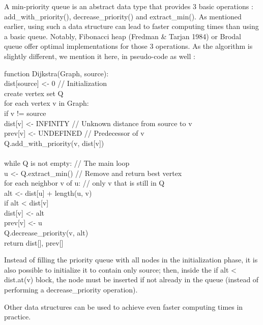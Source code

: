 \documentclass{article}
\newcommand\tab[1][1cm]{\hspace*{#1}}
\begin{document}
A min-priority queue is an abstract data type that provides 3 basic operations : add\_with\_priority(), decrease\_priority() and extract\_min(). As mentioned earlier, using such a data structure can lead to faster computing times than using a basic queue. Notably, Fibonacci heap (Fredman \& Tarjan 1984) or Brodal queue offer optimal implementations for those 3 operations. As the algorithm is slightly different, we mention it here, in pseudo-code as well :
\begin{framed}
function Dijkstra(Graph, source):\\
\tab dist[source] <- 0 				// Initialization\\
	\tab create vertex set Q\\
	\tab for each vertex v in Graph: \\          
		\tab\tab if v != source\\
			\tab\tab dist[v] <- INFINITY     	// Unknown distance from source to v\\
			\tab\tab\tab prev[v] <- UNDEFINED    	// Predecessor of v\\
		\tab\tab Q.add\_with\_priority(v, dist[v])\\
\\
	\tab while Q is not empty:    	  	// The main loop\\
		\tab\tab u <- Q.extract\_min()         // Remove and return best vertex\\
		\tab\tab for each neighbor v of u:   // only v that is still in Q\\
			\tab\tab\tab alt <- dist[u] + length(u, v) \\
			\tab\tab if alt < dist[v]\\
				\tab\tab dist[v] <- alt\\
				\tab\tab prev[v] <- u\\
				\tab\tab Q.decrease\_priority(v, alt)\\
	\tab return dist[], prev[]\\
%    
\end{framed}



Instead of filling the priority queue with all nodes in the initialization phase, it is also possible to initialize it to contain only source; then, inside the if alt < dist.at(v) block, the node must be inserted if not already in the queue (instead of performing a decrease\_priority operation).

Other data structures can be used to achieve even faster computing times in practice.
\end{document}
